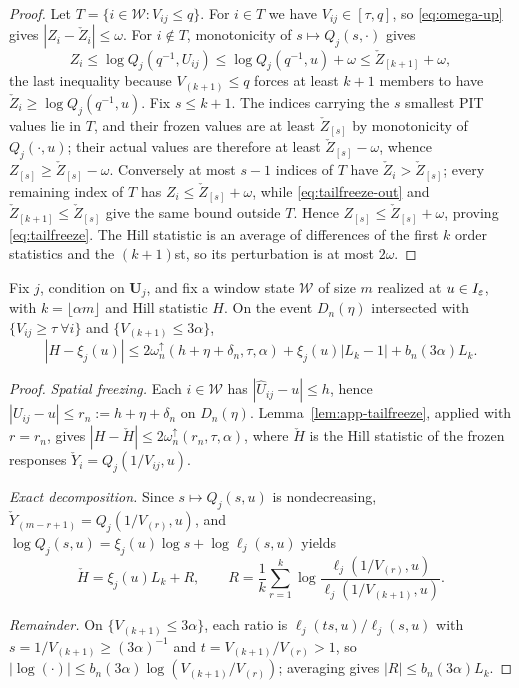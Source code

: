 \begin{proof}
Let $T=\{i\in\mathcal W:V_{ij}\le q\}$.  For $i\in T$ we have
$V_{ij}\in[\tau,q]$, so \eqref{eq:omega-up} gives
$|Z_i-\check Z_i|\le\omega$.  For $i\notin T$, monotonicity of
$s\mapsto Q_j(s,\cdot)$ gives
\begin{equation}\label{eq:tailfreeze-out}
 Z_i\le\log Q_j(q^{-1},U_{ij})\le\log Q_j(q^{-1},u)+\omega
 \le\check Z_{[k+1]}+\omega,
\end{equation}
the last inequality because $V_{(k+1)}\le q$ forces at least $k+1$ members
to have $\check Z_i\ge\log Q_j(q^{-1},u)$.  Fix $s\le k+1$.  The indices
carrying the $s$ smallest PIT values lie in $T$, and their frozen values
are at least $\check Z_{[s]}$ by monotonicity of $Q_j(\cdot,u)$; their
actual values are therefore at least $\check Z_{[s]}-\omega$, whence
$Z_{[s]}\ge\check Z_{[s]}-\omega$.  Conversely at most $s-1$ indices of
$T$ have $\check Z_i>\check Z_{[s]}$; every remaining index of $T$ has
$Z_i\le\check Z_{[s]}+\omega$, while \eqref{eq:tailfreeze-out} and
$\check Z_{[k+1]}\le\check Z_{[s]}$ give the same bound outside $T$.
Hence $Z_{[s]}\le\check Z_{[s]}+\omega$, proving
\eqref{eq:tailfreeze}.  The Hill statistic is an average of differences
of the first $k$ order statistics and the $(k+1)$st, so its perturbation
is at most $2\omega$.
\end{proof}

\begin{lemma}\label{lem:app-hill}
Fix $j$, condition on $\bm U_j$, and fix a window state $\mathcal W$ of
size $m$ realized at $u\in I_\varepsilon$, with $k=\lfloor\alpha m\rfloor$ and Hill
statistic $H$.  On the event $D_n(\eta)$ intersected with
$\{V_{ij}\ge\tau\ \forall i\}$ and $\{V_{(k+1)}\le3\alpha\}$,
\begin{equation}
 |H-\xi_j(u)|
 \le2\omega_n^{\uparrow}(h+\eta+\delta_n,\tau,\alpha)
 +\xi_j(u)|L_k-1|+b_n(3\alpha)L_k.
 \label{eq:A3app}
\end{equation}
\end{lemma}

\begin{proof}
\emph{Spatial freezing.}  Each $i\in\mathcal W$ has
$|\widehat U_{ij}-u|\le h$, hence $|U_{ij}-u|\le r_n:=h+\eta+\delta_n$ on
$D_n(\eta)$.  Lemma~\ref{lem:app-tailfreeze}, applied with $r=r_n$, gives
$|H-\check H|\le2\omega_n^{\uparrow}(r_n,\tau,\alpha)$, where $\check H$
is the Hill statistic of the frozen responses
$\check Y_i=Q_j(1/V_{ij},u)$.

\emph{Exact decomposition.}  Since $s\mapsto Q_j(s,u)$ is nondecreasing,
$\check Y_{(m-r+1)}=Q_j(1/V_{(r)},u)$, and
$\log Q_j(s,u)=\xi_j(u)\log s+\log\ell_j(s,u)$ yields
\[
 \check H=\xi_j(u)L_k+R,
 \qquad
 R=\frac1k\sum_{r=1}^k
 \log\frac{\ell_j(1/V_{(r)},u)}{\ell_j(1/V_{(k+1)},u)}.
\]

\emph{Remainder.}  On $\{V_{(k+1)}\le3\alpha\}$, each ratio is
$\ell_j(ts,u)/\ell_j(s,u)$ with $s=1/V_{(k+1)}\ge(3\alpha)^{-1}$ and
$t=V_{(k+1)}/V_{(r)}>1$, so
$|\log(\cdot)|\le b_n(3\alpha)\log(V_{(k+1)}/V_{(r)})$; averaging gives
$|R|\le b_n(3\alpha)L_k$.
\end{proof}


